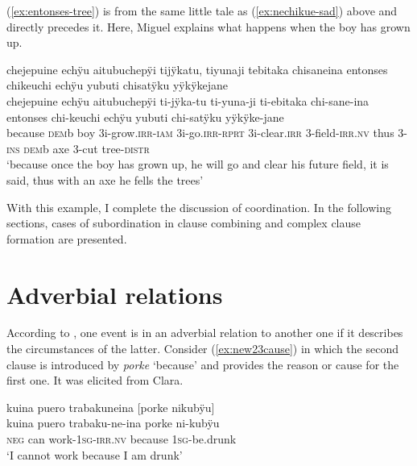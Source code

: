 (\ref{ex:entonses-tree}) is from the same little tale as (\ref{ex:nechikue-sad}) above and directly precedes it. Here, Miguel explains what happens when the boy has grown up.

\ea\label{ex:entonses-tree}
\begingl
\glpreamble chejepuine echÿu aitubuchepÿi tijÿkatu, tiyunaji tebitaka chisaneina entonses chikeuchi echÿu yubuti chisatÿku yÿkÿkejane\\
\gla chejepuine echÿu aitubuchepÿi ti-jÿka-tu ti-yuna-ji ti-ebitaka chi-sane-ina entonses chi-keuchi echÿu yubuti chi-satÿku yÿkÿke-jane\\
\glb because \textsc{dem}b boy 3i-grow.\textsc{irr}-\textsc{iam} 3i-go.\textsc{irr}-\textsc{rprt} 3i-clear.\textsc{irr} 3-field-\textsc{irr.nv} thus 3-\textsc{ins} \textsc{dem}b axe 3-cut tree-\textsc{distr}\\
\glft ‘because once the boy has grown up, he will go and clear his future field, it is said, thus with an axe he fells the trees’
\endgl
{}
\xe


With this example, I complete the discussion of coordination. In the following sections, cases of subordination in clause combining and complex clause formation are presented.


\section{Adverbial relations}\label{sec:AdverbialClauses}

According to \citet[155]{Cristofaro2003}, one event is in an adverbial relation to another one if it describes the circumstances of the latter. Consider (\ref{ex:new23cause}) in which the second clause is introduced by \textit{porke} ‘because’ and provides the reason or cause for the first one. It was elicited from Clara.

\ea\label{ex:new23cause}
\begingl
\glpreamble kuina puero trabakuneina \textup{[}porke nikubÿu\textup{]}\\
\gla kuina puero trabaku-ne-ina porke ni-kubÿu\\
\glb \textsc{neg} can work-1\textsc{sg}-\textsc{irr.nv} because 1\textsc{sg}-be.drunk\\
\glft ‘I cannot work because I am drunk’
\endgl
\trailingcitation{[cux-c120414ls-1.062-063]}
\xe

